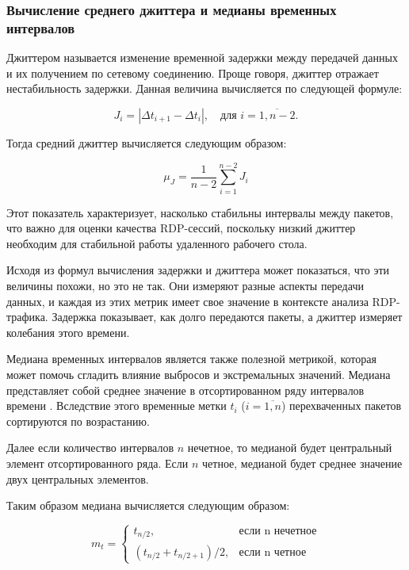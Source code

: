 \documentclass[spec, och, diploma]{SCWorks}
\begin{document}
\subsubsection{Вычисление среднего джиттера и медианы временных интервалов}

   Джиттером называется изменение временной задержки между передачей данных и их получением по сетевому соединению.
   Проще говоря, джиттер отражает нестабильность задержки. Данная величина вычисляется по следующей формуле:

   \begin{equation}
      J_i = |\Delta t_{i+1} - \Delta t_i|, \quad \text{для } i = \overline{1, n - 2}.
   \end{equation}

  Тогда средний джиттер вычисляется следующим образом:

   \begin{equation}
    \mu_J = \frac{1}{n-2} \sum_{i=1}^{n-2} J_i
   \end{equation}

   Этот показатель характеризует, насколько стабильны интервалы между пакетов, что важно для оценки качества RDP-сессий, 
   поскольку низкий джиттер необходим для стабильной работы удаленного рабочего стола. 
   
   Исходя из формул вычисления задержки и джиттера может показаться, что эти величины похожи, но это не так. Они измеряют разные 
   аспекты передачи данных, и каждая из этих метрик имеет свое значение в контексте анализа RDP-трафика. Задержка показывает, как долго 
   передаются пакеты, а джиттер измеряет колебания этого времени.

   Медиана временных интервалов является также полезной метрикой, которая может помочь сгладить влияние выбросов и экстремальных значений. 
   Медиана представляет собой среднее значение в отсортированном ряду интервалов времени \cite{dev0}. Вследствие этого временные метки $t_i$ ($i = \overline{1, n}$) 
   перехваченных пакетов сортируются по возрастанию.
   
   Далее если количество интервалов $ n $ нечетное, то медианой будет центральный элемент отсортированного ряда. 
   Если $ n $ четное, медианой будет среднее значение двух центральных элементов.

   Таким образом медиана вычисляется следующим образом:

   \begin{equation}
    m_t = 
      \begin{cases}
        t_{n / 2}, & \text{если n нечетное}\\
        (t_{n / 2} + t_{n / 2 + 1}) / 2, & \text{если n четное}
      \end{cases}
   \end{equation}
  
\end{document}
